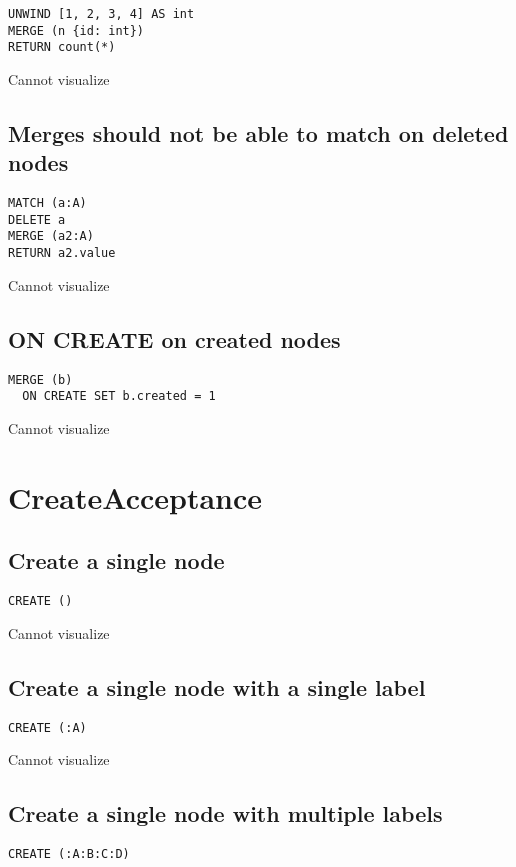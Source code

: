 \begin{lstlisting}
UNWIND [1, 2, 3, 4] AS int
MERGE (n {id: int})
RETURN count(*)
\end{lstlisting}

Cannot visualize
\subsection{Merges should not be able to match on deleted nodes}

\begin{lstlisting}
MATCH (a:A)
DELETE a
MERGE (a2:A)
RETURN a2.value
\end{lstlisting}

Cannot visualize
\subsection{ON CREATE on created nodes}

\begin{lstlisting}
MERGE (b)
  ON CREATE SET b.created = 1
\end{lstlisting}

Cannot visualize
\section{CreateAcceptance}

\subsection{Create a single node}

\begin{lstlisting}
CREATE ()
\end{lstlisting}

Cannot visualize
\subsection{Create a single node with a single label}

\begin{lstlisting}
CREATE (:A)
\end{lstlisting}

Cannot visualize
\subsection{Create a single node with multiple labels}

\begin{lstlisting}
CREATE (:A:B:C:D)
\end{lstlisting}

